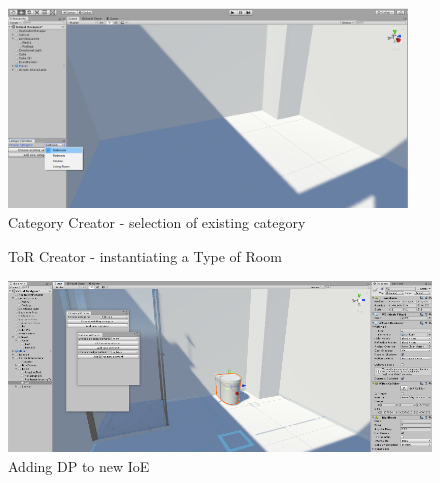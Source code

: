 \documentclass[runningheads]{llncs}
\begin{document}
\begin{figure}[H]
\centering
\includegraphics[width=\textwidth, height=5.3cm]{editor1.png}
\caption{Category Creator - selection of existing category} \label{fig3}
\end{figure}

\begin{figure}
     \centering
     \hspace{0.5cm}
     \caption{ToR Creator - instantiating a Type of Room}
     \label{steady_state}
\end{figure}

\begin{figure}[H]
\centering
\includegraphics[width=\textwidth, height=4.55cm]{editor4.png}
\caption{Adding DP to new IoE} \label{fig6}
\end{figure}
\end{document}

